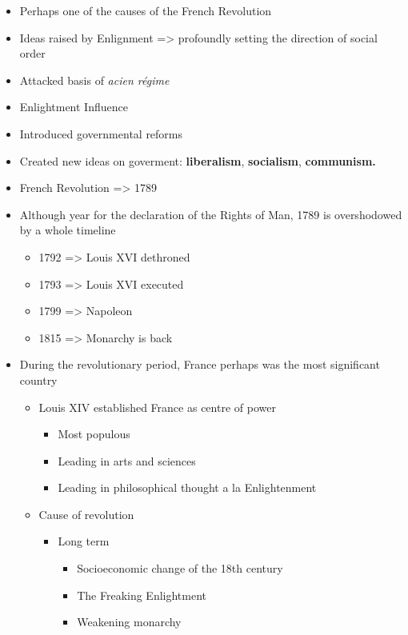 \documentclass[letterpaper]{article}
\begin{document}
\begin{itemize}
\item Perhaps one of the causes of the French Revolution
\item Ideas raised by Enlignment => profoundly setting the direction of
social order
\item Attacked basis of \emph{acien régime}
\item Enlightment Influence
\item Introduced governmental reforms
\item Created new ideas on goverment: \textbf{liberalism}, \textbf{socialism},
\textbf{communism.}
\item French Revolution => 1789
\item Although year for the declaration of the Rights of Man, 1789 is
overshodowed by a whole timeline

\begin{itemize}
\item 1792 => Louis XVI dethroned
\item 1793 => Louis XVI executed
\item 1799 => Napoleon
\item 1815 => Monarchy is back
\end{itemize}

\item During the revolutionary period, France perhaps was the most
significant country

\begin{itemize}
\item Louis XIV established France as centre of power

\begin{itemize}
\item Most populous
\item Leading in arts and sciences
\item Leading in philosophical thought a la Enlightenment
\end{itemize}

\item Cause of revolution

\begin{itemize}
\item Long term

\begin{itemize}
\item Socioeconomic change of the 18th century
\item The Freaking Enlightment
\item Weakening monarchy\\
\end{itemize}


\end{itemize}
\end{itemize}
\end{itemize}
\end{document}
